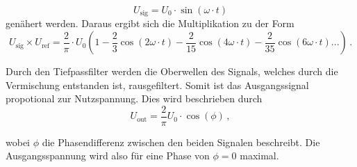 \begin{equation}
    U_\text{sig} = U_0 \cdot \sin(\omega \cdot t)
    \label{eqn:usig}
\end{equation}
\noindent
genähert werden. Daraus ergibt sich die Multiplikation zu der Form 
\begin{equation}
    U_\text{sig} \times U_\text{ref} = \frac{2}{\pi} \cdot U_0(1 - \frac{2}{3}\cos(2\omega \cdot t)  -  \frac{2}{15}\cos(4\omega \cdot t) - \frac{2}{35}\cos(6\omega \cdot t)...) \, .
    \label{eqn:urefsig}
\end{equation}

\noindent
Durch den Tiefpassfilter werden die Oberwellen des Signals, welches durch die Vermischung entstanden ist, rausgefiltert. Somit ist das Ausgangssignal
propotional zur Nutzspannung. Dies wird beschrieben durch
\begin{equation}
    U_\text{out} = \frac{2}{\pi} U_0 \cdot \cos(\phi) \, ,
    \label{eqn:uout2}
\end{equation}

\noindent
wobei $\phi$ die Phasendifferenz zwischen den beiden Signalen beschreibt. Die Ausgangsspannung wird also für eine Phase von $\phi=0$ maximal.